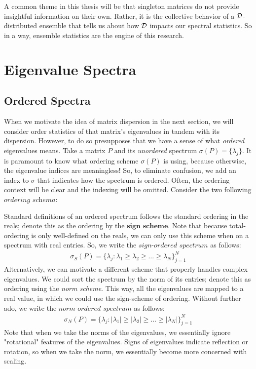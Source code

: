 A common theme in this thesis will be that singleton matrices do not provide insightful information on their own. Rather, it is the collective behavior of a $\mathcal{D}$-distributed ensemble that tells us about how $\mathcal{D}$ impacts our spectral statistics. So in a way, ensemble statistics are the engine of this research.


\section{Eigenvalue Spectra}


\subsection{Ordered Spectra}
When we motivate the idea of matrix dispersion in the next section, we will consider order statistics of that matrix's eigenvalues in tandem with its dispersion. However, to do so presupposes that we have a sense of what \textit{ordered} eigenvalues means. Take a matrix $P$ and its \textit{unordered} spectrum $\sigma(P) = \{\lambda_j\}$. It is paramount to know what ordering scheme $\sigma(P)$ is using, because otherwise, the eigenvalue indices are meaningless! So, to eliminate confusion, we add an index to $\sigma$ that indicates how the spectrum is ordered. Often, the ordering context will be clear and the indexing will be omitted. Consider the two following $\textit{ordering schema}$:

Standard definitions of an ordered spectrum follows the standard ordering in the reals; denote this as the ordering by the $\textbf{sign scheme}$. Note that because total-ordering is only well-defined on the reals, we can only use this scheme when on a spectrum with real entries. So, we write the $\textit{sign-ordered spectrum}$ as follows:
\begin{align*}
\sigma_S(P) = \{\lambda_j : \lambda_1 \geq \lambda_2 \geq \dots \geq \lambda_N\}_{j = 1}^N
\end{align*}
Alternatively, we can motivate a different scheme that properly handles complex eigenvalues. We could sort the spectrum by the norm of its entries; denote this as ordering using the \textit{norm scheme}. This way, all the eigenvalues are mapped to a real value, in which we could use the sign-scheme of ordering. Without further ado, we write the $\textit{norm-ordered spectrum}$ as follows:
\begin{align*}
\sigma_N(P) = \{\lambda_j : |\lambda_1| \geq |\lambda_2| \geq \dots \geq |\lambda_N|\}_{j = 1}^N
\end{align*}
Note that when we take the norms of the eigenvalues, we essentially ignore "rotational" features of the eigenvalues. Signs of eigenvalues indicate reflection or rotation, so when we take the norm, we essentially become more concerned with scaling. 

